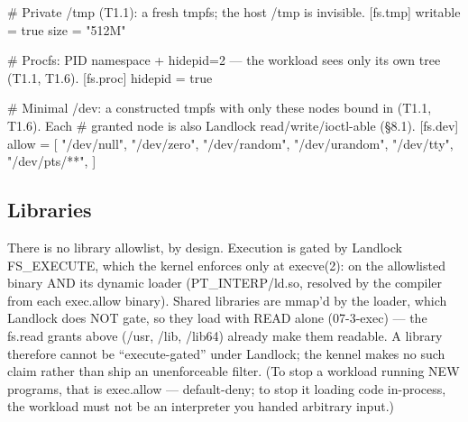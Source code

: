 
\begin{kennelcode}
# Private /tmp (T1.1): a fresh tmpfs; the host /tmp is invisible.
[fs.tmp]
writable = true
size = "512M"
\end{kennelcode}

\begin{kennelcode}
# Procfs: PID namespace + hidepid=2 — the workload sees only its own tree (T1.1, T1.6).
[fs.proc]
hidepid = true
\end{kennelcode}

\begin{kennelcode}
# Minimal /dev: a constructed tmpfs with only these nodes bound in (T1.1, T1.6). Each
# granted node is also Landlock read/write/ioctl-able (§8.1).
[fs.dev]
allow = [
    "/dev/null", "/dev/zero", "/dev/random", "/dev/urandom",
    "/dev/tty", "/dev/pts/**",
]
\end{kennelcode}

\hypertarget{libraries}{%
\subsection{Libraries}\label{libraries}}

There is no library allowlist, by design. Execution is gated by Landlock
FS\_EXECUTE, which the kernel enforces only at execve(2): on the
allowlisted binary AND its dynamic loader (PT\_INTERP/ld.so, resolved by
the compiler from each exec.allow binary). Shared libraries are mmap'd
by the loader, which Landlock does NOT gate, so they load with READ
alone (07-3-exec) --- the fs.read grants above (/usr, /lib, /lib64)
already make them readable. A library therefore cannot be
``execute-gated'' under Landlock; the kennel makes no such claim rather
than ship an unenforceable filter. (To stop a workload running NEW
programs, that is exec.allow --- default-deny; to stop it loading code
in-process, the workload must not be an interpreter you handed arbitrary
input.)

